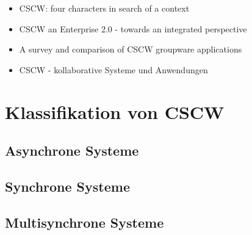	

\begin{itemize}
	\item {CSCW: four characters in search of a context}
	\item {CSCW an Enterprise 2.0 - towards an integrated perspective}
	\item {A survey and comparison of CSCW groupware applications}
	\item {CSCW - kollaborative Systeme und Anwendungen}
\end{itemize}

\section{Klassifikation von CSCW}
\subsection{Asynchrone Systeme}
\subsection{Synchrone Systeme}
\subsection{Multisynchrone Systeme}

